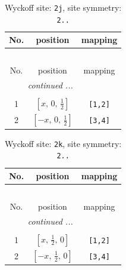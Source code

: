 \documentclass[fleqn,8pt]{jsarticle}
\begin{document}
\renewcommand{\arraystretch}{1.2}
\begin{longtable}{ccc}
\caption{Wyckoff site: {\tt 2j}, site symmetry: {\tt 2..}}
 \\
 \hline \hline
No. & position & mapping \\ \hline \endfirsthead

\multicolumn{2}{l}{\tablename\ \thetable{}} \\
 \hline \hline
No. & position & mapping \\ \hline \endhead

 \hline \hline
\multicolumn{2}{r}{\footnotesize\it continued ...} \\ \endfoot

 \hline \hline
\multicolumn{2}{r}{} \\ \endlastfoot

1 & $\left[ x,\, 0,\, \frac{1}{2} \right]$ & {\tt [1,2]} \\ \hline
2 & $\left[ - x,\, 0,\, \frac{1}{2} \right]$ & {\tt [3,4]} \\
\end{longtable}
\renewcommand{\arraystretch}{1.2}
\begin{longtable}{ccc}
\caption{Wyckoff site: {\tt 2k}, site symmetry: {\tt 2..}}
 \\
 \hline \hline
No. & position & mapping \\ \hline \endfirsthead

\multicolumn{2}{l}{\tablename\ \thetable{}} \\
 \hline \hline
No. & position & mapping \\ \hline \endhead

 \hline \hline
\multicolumn{2}{r}{\footnotesize\it continued ...} \\ \endfoot

 \hline \hline
\multicolumn{2}{r}{} \\ \endlastfoot

1 & $\left[ x,\, \frac{1}{2},\, 0 \right]$ & {\tt [1,2]} \\ \hline
2 & $\left[ - x,\, \frac{1}{2},\, 0 \right]$ & {\tt [3,4]} \\
\end{longtable}
\renewcommand{\arraystretch}{1.2}
\end{document}
